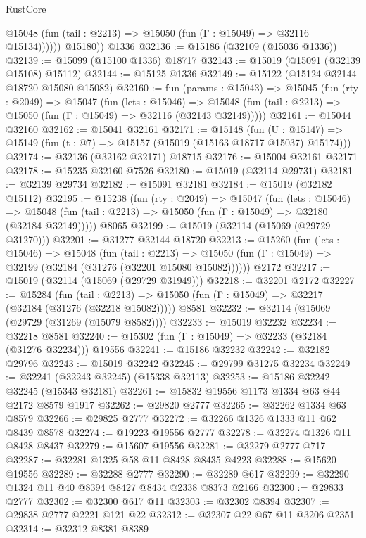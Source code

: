 \begin{lexlean}{RustCore}
\begin{coremodule}
              @15048 (fun (tail : @2213) => @15050 (fun (Γ : @15049) => @32116 @15134))))))
        @15180))
    @1336
@32136 := @15186 (@32109 (@15036 @1336))
@32139 := @15099 (@15100 @1336) @18717
@32143 := @15019 (@15091 (@32139 @15108) @15112)
@32144 := @15125 @1336
@32149 := @15122 (@15124 @32144 @18720 @15080 @15082)
@32160 := fun (params : @15043) =>
  @15045
    (fun (rty : @2049) =>
    @15047
      (fun (lets : @15046) =>
      @15048 (fun (tail : @2213) => @15050 (fun (Γ : @15049) => @32116 (@32143 @32149)))))
@32161 := @15044 @32160
@32162 := @15041 @32161
@32171 := @15148
    (fun (U : @15147) => @15149 (fun (t : @7) => @15157 (@15019 (@15163 @18717 @15037) @15174)))
@32174 := @32136 (@32162 @32171) @18715
@32176 := @15004 @32161 @32171
@32178 := @15235 @32160 @7526
@32180 := @15019 (@32114 @29731)
@32181 := @32139 @29734
@32182 := @15091 @32181
@32184 := @15019 (@32182 @15112)
@32195 := @15238
    (fun (rty : @2049) =>
    @15047
      (fun (lets : @15046) =>
      @15048 (fun (tail : @2213) => @15050 (fun (Γ : @15049) => @32180 (@32184 @32149)))))
    @8065
@32199 := @15019 (@32114 (@15069 (@29729 @31270)))
@32201 := @31277 @32144 @18720
@32213 := @15260
    (fun (lets : @15046) =>
    @15048
      (fun (tail : @2213) =>
      @15050 (fun (Γ : @15049) => @32199 (@32184 (@31276 (@32201 @15080 @15082))))))
    @2172
@32217 := @15019 (@32114 (@15069 (@29729 @31949)))
@32218 := @32201 @2172
@32227 := @15284
    (fun (tail : @2213) => @15050 (fun (Γ : @15049) => @32217 (@32184 (@31276 (@32218 @15082)))))
    @8581
@32232 := @32114 (@15069 (@29729 (@31269 (@15079 @8582))))
@32233 := @15019 @32232
@32234 := @32218 @8581
@32240 := @15302 (fun (Γ : @15049) => @32233 (@32184 (@31276 @32234))) @19556
@32241 := @15186 @32232
@32242 := @32182 @29796
@32243 := @15019 @32242
@32245 := @29799 @31275 @32234
@32249 := @32241 (@32243 @32245) (@15338 @32113)
@32253 := @15186 @32242 @32245 (@15343 @32181)
@32261 := @15832 @19556 @1173 @1334 @63 @44 @2172 @8579 @1917
@32262 := @29820 @2777
@32265 := @32262 @1334 @63 @8579
@32266 := @29825 @2777
@32272 := @32266 @1326 @1333 @11 @62 @8439 @8578
@32274 := @19223 @19556 @2777
@32278 := @32274 @1326 @11 @8428 @8437
@32279 := @15607 @19556
@32281 := @32279 @2777 @717
@32287 := @32281 @1325 @58 @11 @8428 @8435 @4223
@32288 := @15620 @19556
@32289 := @32288 @2777
@32290 := @32289 @617
@32299 := @32290 @1324 @11 @40 @8394 @8427 @8434 @2338 @8373 @2166
@32300 := @29833 @2777
@32302 := @32300 @617 @11
@32303 := @32302 @8394
@32307 := @29838 @2777 @2221 @121 @22
@32312 := @32307 @22 @67 @11 @3206 @2351
@32314 := @32312 @8381 @8389

\end{coremodule}
\end{lexlean}
